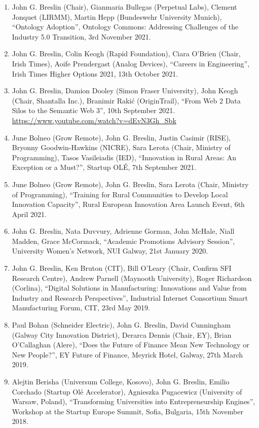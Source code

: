\documentclass[10pt,a4paper]{res} %
\begin{document}
\begin{resume}
\begin{enumerate}
\item John G. Breslin (Chair), Gianmaria Bullegas (Perpetual Labs), Clement Jonquet (LIRMM), Martin Hepp (Bundeswehr University Munich), ``Ontology Adoption'', Ontology Commons: Addressing Challenges of the Industry 5.0 Transition, 3rd November 2021.
\item John G. Breslin, Colin Keogh (Rapid Foundation), Ciara O'Brien (Chair, Irish Times), Aoife Prendergast (Analog Devices), ``Careers in Engineering'', Irish Times Higher Options 2021, 13th October 2021.
\item John G. Breslin, Damion Dooley (Simon Fraser University), John Keogh (Chair, Shantalla Inc.), Branimir Raki\'{c} (OriginTrail), ``From Web 2 Data Silos to the Semantic Web 3'', 10th September 2021. \url{https://www.youtube.com/watch?v=dEvN3Gh_Sbk}
\item June Bolneo (Grow Remote), John G. Breslin, Justin Casimir (RISE), Bryonny Goodwin-Hawkins (NICRE), Sara Lerota (Chair, Ministry of Programming), Tasos Vasileiadis (IED), ``Innovation in Rural Areas: An Exception or a Must?'', Startup OL\'{E}, 7th September 2021.
\item June Bolneo (Grow Remote), John G. Breslin, Sara Lerota (Chair, Ministry of Programming), ``Training for Rural Communities to Develop Local Innovation Capacity'', Rural European Innovation Area Launch Event, 6th April 2021.
\item John G. Breslin, Nata Duvvury, Adrienne Gorman, John McHale, Niall Madden, Grace McCormack, ``Academic Promotions Advisory Session'', University Women's Network, NUI Galway, 21st January 2020.
\item John G. Breslin, Ken Bruton (CIT), Bill O'Leary (Chair, Confirm SFI Research Centre), Andrew Parnell (Maynooth University), Roger Richardson (Corlina), ``Digital Solutions in Manufacturing: Innovations and Value from Industry and Research Perspectives'', Industrial Internet Consortium Smart Manufacturing Forum, CIT, 23rd May 2019.
\item Paul Bohan (Schneider Electric), John G. Breslin, David Cunningham (Galway City Innovation District), Derarca Dennis (Chair, EY), Brian O'Callaghan (Alere), ``Does the Future of Finance Mean New Technology or New People?'', EY Future of Finance, Meyrick Hotel, Galway, 27th March 2019.
\item Alejtin Berisha (Universum College, Kosovo), John G. Breslin, Emilio Corchado (Startup Ol\'{e} Accelerator), Agnieszka Pugacewicz (University of Warsaw, Poland), ``Transforming Universities into Entrepreneurship Engines'', Workshop at the Startup Europe Summit, Sofia, Bulgaria, 15th November 2018.

\end{enumerate}
\end{resume}
\end{document}
